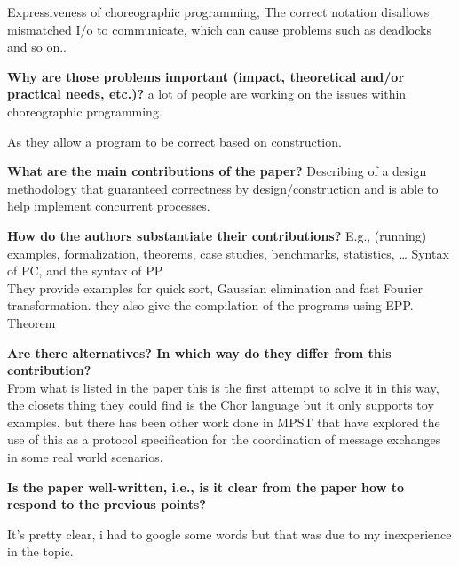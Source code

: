 \documentclass[a4paper,10pt,titlepage]{report}
\begin{document}
Expressiveness of choreographic programming, 
The correct notation disallows mismatched I/o to communicate, which can cause problems such as deadlocks and so on..

\vspace{5mm}

\textbf{\itemTitle Why are those problems important (impact, theoretical
and/or practical needs, etc.)?}
a lot of people are working on the issues within choreographic programming.

As they allow a program to be correct based on construction.
\vspace{5mm}

\textbf{\itemTitle What are the main contributions of the paper?}	
Describing of a design methodology that guaranteed correctness by design/construction and is able to help implement concurrent processes.

\vspace{5mm}


\textbf{\itemTitle How do the authors substantiate their contributions?} E.g., 
(running) examples, formalization, theorems, case studies, benchmarks,
statistics, \dots
Syntax of PC, and the syntax of PP \\
They provide examples for quick sort, Gaussian elimination and fast Fourier transformation. they also give the compilation of the programs using EPP. \\
Theorem 

\vspace{5mm}
\textbf{\itemTitle Are there alternatives? In which way do they differ from this
contribution?} \\

From what is listed in the paper this is the first attempt to solve it in this way, the closets thing they could find is the Chor language but it only supports toy examples. but there has been other work done in MPST that have explored the use of this as a protocol specification for the coordination of message exchanges in some real world scenarios.

\vspace{5mm}



\textbf{\itemTitle Is the paper well-written, i.e., is it clear from the paper how
to respond to the previous points?}

It's pretty clear, i had to google some words but that was due to my inexperience in the topic.
\vspace{5mm}
\end{document}

